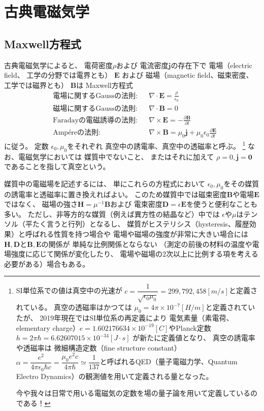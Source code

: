 \section{古典電磁気学}

\subsection{Maxwell方程式}

古典電磁気学によると、
電荷密度$\rho$および
電流密度$\bm{j}$の存在下で
電場（electric field、
工学の分野では電界とも）
$\bm{E}$
および
磁場（magnetic field、磁束密度、
工学では磁界とも）
$\bm{B}$は
Maxwell方程式
\begin{subequations}
\begin{align}
&\text{電場に関するGaussの法則}:
  &&\nabla \cdot \bm{E}
=
  \frac{\rho}{\epsilon_0}
\label{eq:maxwell-divE}
\\
&\text{磁場に関するGaussの法則}:
  &&\nabla \cdot \bm{B}
= 0
\label{eq:maxwell-divB}
\\
&\text{Faradayの電磁誘導の法則}:
  &&\nabla \times \bm{E}
=
  - \frac{\partial \bm{B}}
    {\partial t}
\label{eq:maxwell-rot E}
\\
&\text{Amp\'ereの法則}:
  &&\nabla \times \bm{B}
=
  \mu_0 \bm{j}
  +
  \mu_0 \epsilon_0
    \frac{\partial \bm{E}}
      {\partial t}
\label{eq:maxwell-rot B}
\end{align}
\end{subequations}
に従う。
定数
$\epsilon_0, \mu_0$をそれぞれ
真空中の誘電率、真空中の透磁率と呼ぶ。
\footnote{
  SI単位系での値は真空中の光速が
  $c = \dfrac{1}{\sqrt{\epsilon_0 \mu_0}} =299,792,458[m/s]$と定義されている。
  真空の透磁率はかつては
  $\mu_0 = 4 \pi \times 10^{-7} [H/m]$と定義されていたが、
  2019年現在ではSI単位系の再定義により
  電気素量（素電荷、elementary charge）$e = 1.602176634 \times 10^{-19}[C]$やPlanck定数
  $h = 2 \pi \hbar
  = 6.62607015 \times 10^{-34} [J \cdot s]$
  が新たに定義値となり、
  真空の誘電率や透磁率は
  微細構造定数（fine structure constant）
  $\alpha
  = \dfrac{e^2}{ 4 \pi \epsilon_0 \hbar c}
  = \dfrac{\mu_0 e^2 c}{ 4 \pi \hbar}
  \simeq \dfrac{1}{137}$と呼ばれるQED（量子電磁力学、Quantum Electro Dynamics）の観測値を用いて定義される量となった。

  今や我々は日常で用いる電磁気の定数を場の量子論を用いて定義しているのである！
}
なお、電磁気学においては
媒質中でないこと、
またはそれに加えて
$\rho = 0, \bm{j} = \bm{0}$
であることを指して真空という。

媒質中の電磁場を記述するには、
単にこれらの方程式において
$\epsilon_0, \mu_0$をその媒質の誘電率と透磁率に置き換えればよい。
このため媒質中では磁束密度$\bm{B}$や電場$\bm{E}$ではなく、
磁場の強さ$\bm{H} = \mu^{-1} \bm{B}$および
電束密度$\bm{D} = \epsilon \bm{E}$を使うと便利なことも多い。
ただし、非等方的な媒質（例えば異方性の結晶など）中では
$\epsilon$や$\mu$はテンソル（平たく言うと行列）となるし、
媒質がヒステリシス（hysteresis、履歴効果）と呼ばれる性質を持つ場合や
電場や磁場の強度が非常に大きい場合には
$\bm{H}, \bm{D}$と$\bm{B}, \bm{E}$の関係が
単純な比例関係とならない
（測定の前後の材料の温度や電場強度に応じて関係が変化したり、
電場や磁場の$2$次以上に比例する項を考える必要がある）場合もある。

